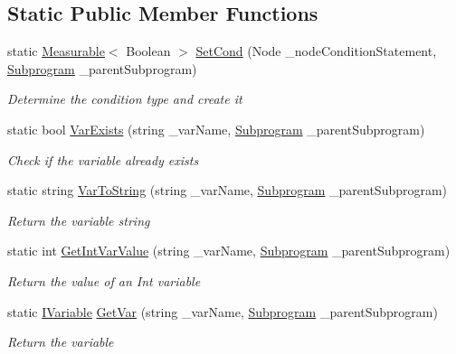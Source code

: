 \subsection*{Static Public Member Functions}
\begin{DoxyCompactItemize}
\item 
static \mbox{\hyperlink{class_krop_1_1_krop_execution_tree_1_1_abstract_class_1_1_measurable}{Measurable}}$<$ Boolean $>$ \mbox{\hyperlink{class_krop_1_1_krop_execution_tree_1_1_subprogram_a3626c09fb9bf11430e8541e2c9740d81}{Set\+Cond}} (Node \+\_\+node\+Condition\+Statement, \mbox{\hyperlink{class_krop_1_1_krop_execution_tree_1_1_subprogram}{Subprogram}} \+\_\+parent\+Subprogram)
\begin{DoxyCompactList}\small\item\em Determine the condition type and create it \end{DoxyCompactList}\item 
static bool \mbox{\hyperlink{class_krop_1_1_krop_execution_tree_1_1_subprogram_af4e885168e0d7bbde2cf26f9f98c7af4}{Var\+Exists}} (string \+\_\+var\+Name, \mbox{\hyperlink{class_krop_1_1_krop_execution_tree_1_1_subprogram}{Subprogram}} \+\_\+parent\+Subprogram)
\begin{DoxyCompactList}\small\item\em Check if the variable already exists \end{DoxyCompactList}\item 
static string \mbox{\hyperlink{class_krop_1_1_krop_execution_tree_1_1_subprogram_abd8a129fb5f66a36c676c766561ffdea}{Var\+To\+String}} (string \+\_\+var\+Name, \mbox{\hyperlink{class_krop_1_1_krop_execution_tree_1_1_subprogram}{Subprogram}} \+\_\+parent\+Subprogram)
\begin{DoxyCompactList}\small\item\em Return the variable string \end{DoxyCompactList}\item 
static int \mbox{\hyperlink{class_krop_1_1_krop_execution_tree_1_1_subprogram_a3f33742aea9a7150f0dda2a17e84cf08}{Get\+Int\+Var\+Value}} (string \+\_\+var\+Name, \mbox{\hyperlink{class_krop_1_1_krop_execution_tree_1_1_subprogram}{Subprogram}} \+\_\+parent\+Subprogram)
\begin{DoxyCompactList}\small\item\em Return the value of an Int variable \end{DoxyCompactList}\item 
static \mbox{\hyperlink{interface_krop_1_1_krop_execution_tree_1_1_interface_1_1_i_variable}{I\+Variable}} \mbox{\hyperlink{class_krop_1_1_krop_execution_tree_1_1_subprogram_a51c0e1153e77771a566d7b6a96d0f26e}{Get\+Var}} (string \+\_\+var\+Name, \mbox{\hyperlink{class_krop_1_1_krop_execution_tree_1_1_subprogram}{Subprogram}} \+\_\+parent\+Subprogram)
\begin{DoxyCompactList}\small\item\em Return the variable \end{DoxyCompactList}\end{DoxyCompactItemize}
